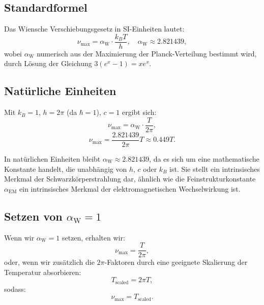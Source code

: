 \documentclass[12pt,a4paper]{article}
\newcommand{\alphaEM}{\alpha_{\text{EM}}}
\newcommand{\alphaW}{\alpha_{\text{W}}}
\begin{document}
	\subsection{Standardformel}
	
	Das Wiensche Verschiebungsgesetz in SI-Einheiten lautet:
	\[
	\nu_{\text{max}} = \alphaW \cdot \frac{k_B T}{h}, \quad \alphaW \approx 2.821439,
	\]
	wobei \(\alphaW\) numerisch aus der Maximierung der Planck-Verteilung bestimmt wird, durch Lösung der Gleichung \(3 (e^x - 1) = x e^x\).
	
	\subsection{Natürliche Einheiten}
	
	Mit \(k_B = 1\), \(h = 2\pi\) (da \(\hbar = 1\)), \(c = 1\) ergibt sich:
	\[
	\nu_{\text{max}} = \alphaW \cdot \frac{T}{2\pi},
	\]
	\[
	\nu_{\text{max}} = \frac{2.821439}{2\pi} T \approx 0.449 T.
	\]
	
	In natürlichen Einheiten bleibt \(\alphaW \approx 2.821439\), da es sich um eine mathematische Konstante handelt, die unabhängig von \(h\), \(c\) oder \(k_B\) ist. Sie stellt ein intrinsisches Merkmal der Schwarzkörperstrahlung dar, ähnlich wie die Feinstrukturkonstante \(\alphaEM\) ein intrinsisches Merkmal der elektromagnetischen Wechselwirkung ist.
	
	\subsection{Setzen von \(\alphaW = 1\)}
	
	Wenn wir \(\alphaW = 1\) setzen, erhalten wir:
	\[
	\nu_{\text{max}} = \frac{T}{2\pi},
	\]
	oder, wenn wir zusätzlich die \(2\pi\)-Faktoren durch eine geeignete Skalierung der Temperatur absorbieren:
	\[
	T_{\text{scaled}} = 2\pi T,
	\]
	sodass:
	\[
	\nu_{\text{max}} = T_{\text{scaled}}.
	\]
	
\end{document}
